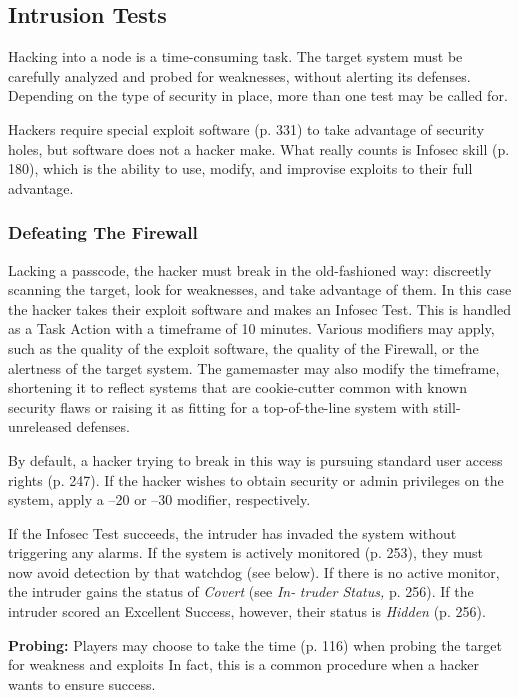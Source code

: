 \subsection{Intrusion Tests} 

Hacking into a node is a time-consuming task. The target system must be carefully analyzed and probed for weaknesses, without alerting its defenses. Depending on the type of security in place, more than one test may be called for. 

Hackers require special exploit software (p. 331) to take advantage of security holes, but software does not a hacker make. What really counts is Infosec skill (p. 180), which is the ability to use, modify, and improvise exploits to their full advantage. 

\subsubsection{Defeating The Firewall} 

Lacking a passcode, the hacker must break in the old-fashioned way: discreetly scanning the target, look for weaknesses, and take advantage of them. In this case the hacker takes their exploit software and makes an Infosec Test. This is handled as a Task Action with a timeframe of 10 minutes. Various modifiers may apply, such as the quality of the exploit software, the quality of the Firewall, or the alertness of the target system. The gamemaster may also modify the timeframe, shortening it to reflect systems that are cookie-cutter common with known security flaws or raising it as fitting for a top-of-the-line system with still-unreleased defenses. 

By default, a hacker trying to break in this way is pursuing standard user access rights (p. 247). If the hacker wishes to obtain security or admin privileges on the system, apply a –20 or –30 modifier, respectively. 

If the Infosec Test succeeds, the intruder has invaded the system without triggering any alarms. If the system is actively monitored (p. 253), they must now avoid detection by that watchdog (see below). If there is no active monitor, the intruder gains the status of \textit{Covert} (see \textit{In-} \textit{truder Status,} p. 256). If the intruder scored an Excellent Success, however, their status is \textit{Hidden }(p. 256). 

\textbf{Probing:} Players may choose to take the time (p. 116) when probing the target for weakness and exploits In fact, this is a common procedure when a hacker wants to ensure success. 

